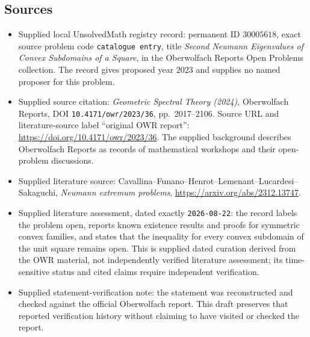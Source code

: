 \documentclass[11pt]{article}
\begin{document}
\subsection{Sources}
\begin{itemize}
\item Supplied local UnsolvedMath registry record: permanent ID \(30005618\), exact source problem code \texttt{catalogue entry}, title \emph{Second Neumann Eigenvalues of Convex Subdomains of a Square}, in the Oberwolfach Reports Open Problems collection. The record gives proposed year \(2023\) and supplies no named proposer for this problem.
\item Supplied source citation: \emph{Geometric Spectral Theory (2024)}, Oberwolfach Reports, DOI \texttt{10.4171/owr/2023/36}, pp.~2017--2106. Source URL and literature-source label ``original OWR report'': \url{https://doi.org/10.4171/owr/2023/36}. The supplied background describes Oberwolfach Reports as records of mathematical workshops and their open-problem discussions.
\item Supplied literature source: Cavallina--Funano--Henrot--Lemenant--Lucardesi--Sakaguchi, \emph{Neumann extremum problems}, \url{https://arxiv.org/abs/2312.13747}.
\item Supplied literature assessment, dated exactly \texttt{2026-08-22}: the record labels the problem open, reports known existence results and proofs for symmetric convex families, and states that the inequality for every convex subdomain of the unit square remains open. This is supplied dated curation derived from the OWR material, not independently verified literature assessment; its time-sensitive status and cited claims require independent verification.
\item Supplied statement-verification note: the statement was reconstructed and checked against the official Oberwolfach report. This draft preserves that reported verification history without claiming to have visited or checked the report.
\end{itemize}
\end{document}
